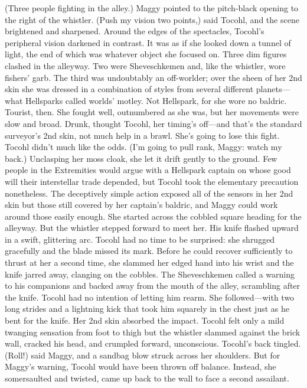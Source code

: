 \documentclass[9pt]{article}
\begin{document}
(Three people fighting in the alley.) Maggy pointed to the pitch-black opening to the right of the
whistler.
(Push my vision two points,) said Tocohl, and the scene brightened and sharpened. Around the
edges of the spectacles, Tocohl’s peripheral vision darkened in contrast. It was as if she looked down a
tunnel of light, the end of which was whatever object she focused on.
Three dim figures clashed in the alleyway. Two were Sheveschkemen and, like the whistler, wore
fishers’ garb. The third was undoubtably an off-worlder; over the sheen of her 2nd skin she was dressed
in a combination of styles from several different planets—what Hellsparks called worlds’ motley. Not
Hellspark, for she wore no baldric. Tourist, then.
She fought well, outnumbered as she was, but her movements were slow and broad. Drunk, thought
Tocohl, her timing’s off—and that’s the standard surveyor’s 2nd skin, not much help in a brawl. She’s
going to lose this fight.
Tocohl didn’t much like the odds. (I’m going to pull rank, Maggy: watch my back.) Unclasping her
moss cloak, she let it drift gently to the ground.
Few people in the Extremities would argue with a Hellspark captain on whose good will their
interstellar trade depended, but Tocohl took the elementary precaution nonetheless. The deceptively
simple action exposed all of the sensors in her 2nd skin but those still covered by her captain’s baldric,
and Maggy could work around those easily enough.
She started across the cobbled square heading for the alleyway.
But the whistler stepped forward to meet her. His knife flashed upward in a swift, glittering arc.
Tocohl had no time to be surprised: she shrugged gracefully and the blade missed its mark. Before he
could recover sufficiently to thrust at her a second time, she slammed her edged hand into his wrist and
the knife jarred away, clanging on the cobbles.
The Sheveschkemen called a warning to his companions and backed away from the mouth of the
alley, scrambling after the knife. Tocohl had no intention of letting him rearm. She followed—with two
long strides and a lightning kick that took him squarely in the chest just as he bent for the knife.
Her 2nd skin absorbed the impact. Tocohl felt only a mild twanging sensation from foot to thigh but
the whistler slammed against the brick wall, cracked his head, and crumpled forward, unconscious.
Tocohl’s back tingled. (Roll!) said Maggy, and a sandbag blow struck across her shoulders. But for
Maggy’s warning, Tocohl would have been thrown off balance. Instead, she somersaulted and twisted,
came up back to the wall to face a second assailant.
\end{document}
